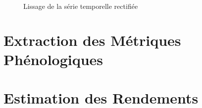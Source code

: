 \begin{figure}[htbp]
 \begin{center}
 \end{center}
 \caption{Lissage de la série temporelle rectifiée}
 \label{fig-lissage-prscor}
\end{figure}

\section{Extraction des Métriques Phénologiques}

\section{Estimation des Rendements}
